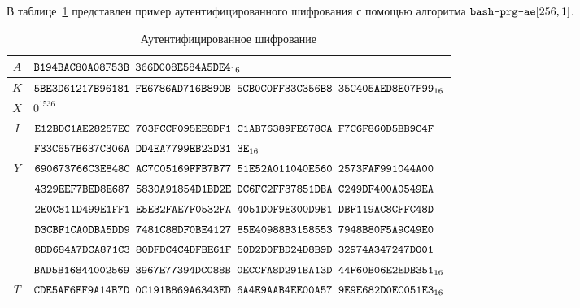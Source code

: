 \label{TEST.PrgAE}

В таблице~\ref{Table.TEST.PrgAE} представлен пример аутентифицированного 
шифрования с помощью алгоритма $\texttt{bash-prg-ae}[256,1]$.

\begin{table}[H]
\caption{Аутентифицированное шифрование}\label{Table.TEST.PrgAE}
\begin{tabular}{|c|l|}
\hline
$A$ &
 $\texttt{B194BAC80A08F53B~366D008E584A5DE4}_{16}$\\
\hline
$K$ &
 $\texttt{5BE3D61217B96181~FE6786AD716B890B~5CB0C0FF33C356B8~35C405AED8E07F99}_{16}$\\
\hline
\hline
$X$ & $0^{1536}$\\
\hline
$I$ &
$\texttt{E12BDC1AE28257EC~703FCCF095EE8DF1~C1AB76389FE678CA~F7C6F860D5BB9C4F}$\\
&
 $\texttt{F33C657B637C306A~DD4EA7799EB23D31~3E}_{16}$\\
\hline
\hline
$Y$ &
$\texttt{690673766C3E848C~AC7C05169FFB7B77~51E52A011040E560~2573FAF991044A00}$\\
&
$\texttt{4329EEF7BED8E687~5830A91854D1BD2E~DC6FC2FF37851DBA~C249DF400A0549EA}$\\
&
$\texttt{2E0C811D499E1FF1~E5E32FAE7F0532FA~4051D0F9E300D9B1~DBF119AC8CFFC48D}$\\
&
$\texttt{D3CBF1CA0DBA5DD9~7481C88DF0BE4127~85E40988B3158553~7948B80F5A9C49E0}$\\
&
$\texttt{8DD684A7DCA871C3~80DFDC4C4DFBE61F~50D2D0FBD24D8B9D~32974A347247D001}$\\
&
 $\texttt{BAD5B16844002569~3967E77394DC088B~0ECCFA8D291BA13D~44F60B06E2EDB351}_{16}$\\
\hline
$T$ &
 $\texttt{CDE5AF6EF9A14B7D~0C191B869A6343ED~6A4E9AAB4EE00A57~9E9E682D0EC051E3}_{16}$\\
\hline
\end{tabular}
\end{table}

